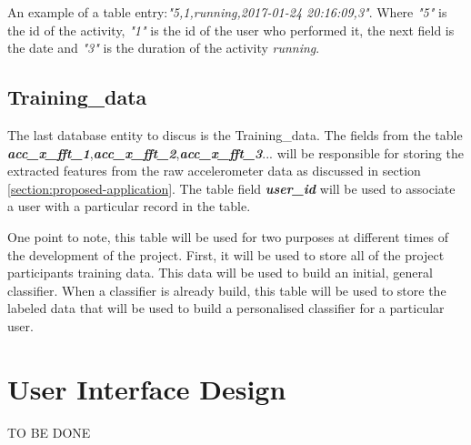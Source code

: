         An example of a table entry:\textit{"5,1,running,2017-01-24 20:16:09,3"}. Where \textit{"5"} is the id of the activity, \textit{"1"} is the id of the user who performed it, the next field is the date and \textit{"3"} is the duration of the activity \textit{running}.
        
        \subsection{Training\_data}
        The last database entity to discus is the Training\_data. The fields from the table \textbf{\textit{acc\_x\_fft\_1}},\newline\textbf{\textit{acc\_x\_fft\_2}},\textbf{\textit{acc\_x\_fft\_3}}... will be responsible for storing the extracted features from the raw accelerometer data as discussed in section \ref{section:proposed-application}. The table field \textbf{\textit{user\_id}} will be used to associate a user with a particular record in the table.
        
        One point to note, this table will be used for two purposes at different times of the development of the project. First, it will be used to store all of the project participants training data. This data will be used to build an initial, general classifier. When a classifier is already build, this table will be used to store the labeled data that will be used to build a personalised classifier for a particular user.
    
    
        
    \section{User Interface Design}
    TO BE DONE